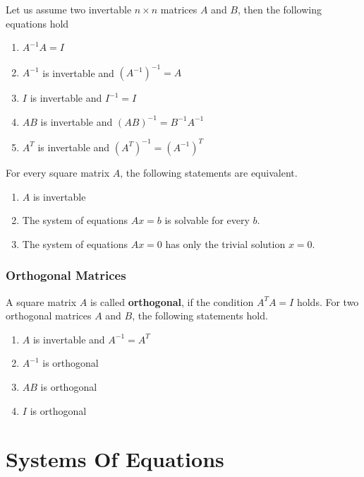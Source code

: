 \documentclass[]{book}
\providecommand{\tightlist}{%
  \setlength{\itemsep}{0pt}\setlength{\parskip}{0pt}}
\theoremstyle{definition}
\theoremstyle{definition}
\theoremstyle{definition}
\theoremstyle{remark}
\begin{document}
Let us assume two invertable \(n\times n\) matrices \(A\) and \(B\), then the following equations hold

\begin{enumerate}
\def\labelenumi{\arabic{enumi}.}
\tightlist
\item
  \(A^{-1}A = I\)
\item
  \(A^{-1}\) is invertable and \((A^{-1})^{-1} = A\)
\item
  \(I\) is invertable and \(I^{-1} = I\)
\item
  \(AB\) is invertable and \((AB)^{-1} = B^{-1}A^{-1}\)
\item
  \(A^T\) is invertable and \((A^T)^{-1} = (A^{-1})^T\)
\end{enumerate}

For every square matrix \(A\), the following statements are equivalent.

\begin{enumerate}
\def\labelenumi{\arabic{enumi}.}
\tightlist
\item
  \(A\) is invertable
\item
  The system of equations \(Ax = b\) is solvable for every \(b\).
\item
  The system of equations \(Ax = 0\) has only the trivial solution \(x=0\).
\end{enumerate}

\hypertarget{intro-linalg-orthogonal-matrix}{%
\subsubsection{Orthogonal Matrices}\label{intro-linalg-orthogonal-matrix}}

A square matrix \(A\) is called \textbf{orthogonal}, if the condition \(A^TA = I\) holds. For two orthogonal matrices \(A\) and \(B\), the following statements hold.

\begin{enumerate}
\def\labelenumi{\arabic{enumi}.}
\tightlist
\item
  \(A\) is invertable and \(A^{-1} = A^T\)
\item
  \(A^{-1}\) is orthogonal
\item
  \(AB\) is orthogonal
\item
  \(I\) is orthogonal
\end{enumerate}

\hypertarget{intro-linalg-systems-of-equations}{%
\section{Systems Of Equations}\label{intro-linalg-systems-of-equations}}
\end{document}
